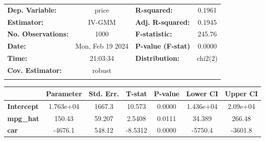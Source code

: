 \begin{center}
\begin{tabular}{lclc}
\toprule
\textbf{Dep. Variable:}    &       price        & \textbf{  R-squared:         } &      0.1961      \\
\textbf{Estimator:}        &       IV-GMM       & \textbf{  Adj. R-squared:    } &      0.1945      \\
\textbf{No. Observations:} &        1000        & \textbf{  F-statistic:       } &      245.76      \\
\textbf{Date:}             &  Mon, Feb 19 2024  & \textbf{  P-value (F-stat)   } &      0.0000      \\
\textbf{Time:}             &      21:03:34      & \textbf{  Distribution:      } &     chi2(2)      \\
\textbf{Cov. Estimator:}   &       robust       & \textbf{                     } &                  \\
\textbf{}                  &                    & \textbf{                     } &                  \\
\bottomrule
\end{tabular}
\begin{tabular}{lcccccc}
                   & \textbf{Parameter} & \textbf{Std. Err.} & \textbf{T-stat} & \textbf{P-value} & \textbf{Lower CI} & \textbf{Upper CI}  \\
\midrule
\textbf{Intercept} &     1.763e+04      &       1667.3       &      10.573     &      0.0000      &     1.436e+04     &      2.09e+04      \\
\textbf{mpg\_hat}  &       150.43       &       59.207       &      2.5408     &      0.0111      &       34.389      &       266.48       \\
\textbf{car}       &      -4676.1       &       548.12       &     -8.5312     &      0.0000      &      -5750.4      &      -3601.8       \\
\bottomrule
\end{tabular}
\end{center}